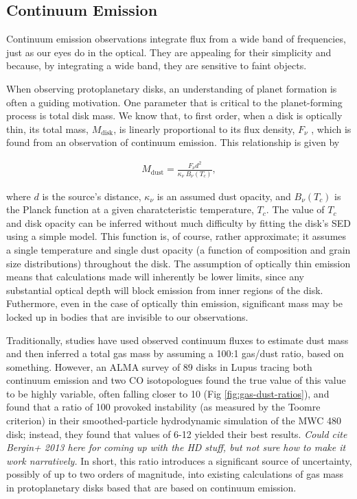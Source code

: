\subsection{Continuum Emission}
\label{section:continuum_emission}

Continuum emission observations integrate flux from a wide band of frequencies, just as our eyes do in the optical. They are appealing for their simplicity and because, by integrating a wide band, they are sensitive to faint objects.

When observing protoplanetary disks, an understanding of planet formation is often a guiding motivation. One parameter that is critical to the planet-forming process is total disk mass. We know that, to first order, when a disk is optically thin, its total mass, $M_{\text{disk}}$, is linearly proportional to its flux density, $F_{\nu}$ \citep{Hildebrand1983}, which is found from an observation of continuum emission. This relationship is given by

\begin{align}
M_{\text{dust}} = \frac{F_{\nu} d^2}{\kappa_{\nu}\ B_{\nu}(T_c)},
\end{align}

where $d$ is the source's distance, $\kappa_{\nu}$ is an assumed dust opacity, and $B_{\nu}(T_c)$ is the Planck function at a given charatcteristic temperature, $T_c$. The value of $T_c$ and disk opacity can be inferred without much difficulty by fitting the disk's SED using a simple model. This function is, of course, rather approximate; it assumes a single temperature and single dust opacity (a function of composition and grain size distributions) throughout the disk. The assumption of optically thin emission means that calculations made will inherently be lower limits, since any substantial optical depth will block emission from inner regions of the disk. Futhermore, even in the case of optically thin emission, significant mass may be locked up in bodies that are invisible to our observations.

Traditionally, studies have used observed continuum fluxes to estimate dust mass and then inferred a total gas mass by assuming a 100:1 gas/dust ratio, based on something. However, an ALMA survey of 89 disks in Lupus tracing both continuum emission and two CO isotopologues \citep{Miotello2016,Miotello2017} found the true value of this value to be highly variable, often falling closer to 10 (Fig \ref{fig:gas-dust-ratios}), and \citet{Liu2018} found that a ratio of 100 provoked instability (as measured by the Toomre criterion) in their smoothed-particle hydrodynamic simulation of the MWC 480 disk; instead, they found that values of 6-12 yielded their best results. \textit{Could cite Bergin+ 2013 here for coming up with the HD stuff, but not sure how to make it work narratively.} In short, this ratio introduces a significant source of uncertainty, possibly of up to two orders of magnitude, into existing calculations of gas mass in protoplanetary disks based that are based on continuum emission.



